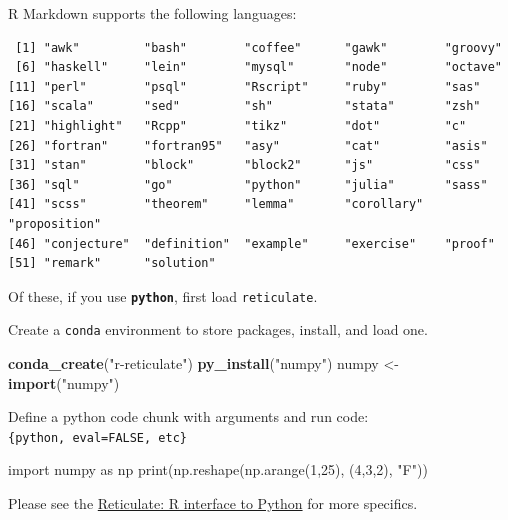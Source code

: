 \documentclass[12pt,oneside]{chicagocapstone}
\newenvironment{Shaded}{\begin{snugshade}}{\end{snugshade}}
\newcommand{\KeywordTok}[1]{\textcolor[rgb]{0.13,0.29,0.53}{\textbf{#1}}}
\newcommand{\DecValTok}[1]{\textcolor[rgb]{0.00,0.00,0.81}{#1}}
\newcommand{\StringTok}[1]{\textcolor[rgb]{0.31,0.60,0.02}{#1}}
\newcommand{\ImportTok}[1]{#1}
\newcommand{\OperatorTok}[1]{\textcolor[rgb]{0.81,0.36,0.00}{\textbf{#1}}}
\newcommand{\BuiltInTok}[1]{#1}
\newcommand{\NormalTok}[1]{#1}
\begin{document}
R Markdown supports the following languages:
\begin{Shaded}
\end{Shaded}
\begin{verbatim}
 [1] "awk"         "bash"        "coffee"      "gawk"        "groovy"     
 [6] "haskell"     "lein"        "mysql"       "node"        "octave"     
[11] "perl"        "psql"        "Rscript"     "ruby"        "sas"        
[16] "scala"       "sed"         "sh"          "stata"       "zsh"        
[21] "highlight"   "Rcpp"        "tikz"        "dot"         "c"          
[26] "fortran"     "fortran95"   "asy"         "cat"         "asis"       
[31] "stan"        "block"       "block2"      "js"          "css"        
[36] "sql"         "go"          "python"      "julia"       "sass"       
[41] "scss"        "theorem"     "lemma"       "corollary"   "proposition"
[46] "conjecture"  "definition"  "example"     "exercise"    "proof"      
[51] "remark"      "solution"   
\end{verbatim}
Of these, if you use \textbf{\texttt{python}}, first load
\texttt{reticulate}.
\begin{Shaded}
\end{Shaded}
Create a \texttt{conda} environment to store packages, install, and load
one.
\begin{Shaded}
\begin{Highlighting}[]
\KeywordTok{conda_create}\NormalTok{(}\StringTok{"r-reticulate"}\NormalTok{)}
\KeywordTok{py_install}\NormalTok{(}\StringTok{"numpy"}\NormalTok{)}
\NormalTok{numpy <-}\StringTok{ }\KeywordTok{import}\NormalTok{(}\StringTok{"numpy"}\NormalTok{)}
\end{Highlighting}
\end{Shaded}
Define a python code chunk with arguments and run code:
\texttt{\{python,\ eval=FALSE,\ etc\}}
\begin{Shaded}
\begin{Highlighting}[]
\ImportTok{import}\NormalTok{ numpy }\ImportTok{as}\NormalTok{ np}
\BuiltInTok{print}\NormalTok{(np.reshape(np.arange(}\DecValTok{1}\NormalTok{,}\DecValTok{25}\NormalTok{), (}\DecValTok{4}\NormalTok{,}\DecValTok{3}\NormalTok{,}\DecValTok{2}\NormalTok{), }\StringTok{"F"}\NormalTok{))}
\end{Highlighting}
\end{Shaded}
Please see the \href{https://rstudio.github.io/reticulate/}{Reticulate:
R interface to Python} for more specifics.
\end{document}

